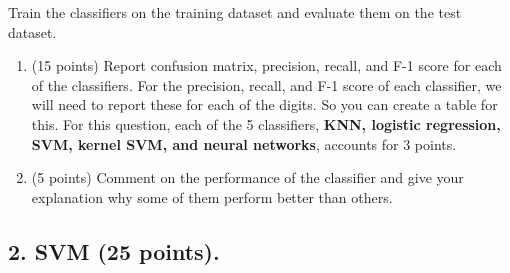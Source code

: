 \documentclass[twoside,10pt]{article}
\begin{document}
Train the classifiers on the training dataset and evaluate them on the test dataset.

\begin{enumerate}

	\item (15 points) Report confusion matrix, precision, recall, and F-1 score for each of the classifiers. For the precision, recall, and F-1 score of each classifier, we will need to report these for each of the digits. So you can create a table for this. For this question, each of the 5 classifiers, {\bf KNN, logistic regression, SVM, kernel SVM, and neural networks}, accounts for 3 points.
	\item (5 points) Comment on the performance of the classifier and give your explanation why some of them perform better than others.	
\end{enumerate}


\subsection*{2. SVM (25 points).}
\end{document}
